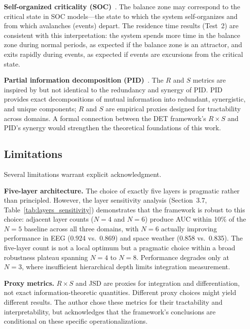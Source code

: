 \documentclass[aip,cha,reprint,amsmath,amssymb]{revtex4-2}
\begin{document}
\textbf{Self-organized criticality (SOC)}~\cite{bak1987,olami1992,strogatz2015}. The balance zone may correspond to the critical state in SOC models---the state to which the system self-organizes and from which avalanches (events) depart. The residence time results (Test~2) are consistent with this interpretation: the system spends more time in the balance zone during normal periods, as expected if the balance zone is an attractor, and exits rapidly during events, as expected if events are excursions from the critical state.

\textbf{Partial information decomposition (PID)}~\cite{williams2010,aguilera2019,popiel2020}. The $R$ and $S$ metrics are inspired by but not identical to the redundancy and synergy of PID. PID provides exact decompositions of mutual information into redundant, synergistic, and unique components; $R$ and $S$ are empirical proxies designed for tractability across domains. A formal connection between the DET framework's $R \times S$ and PID's synergy would strengthen the theoretical foundations of this work.

\subsection{Limitations}

Several limitations warrant explicit acknowledgment.

\textbf{Five-layer architecture.} The choice of exactly five layers is pragmatic rather than principled. However, the layer sensitivity analysis (Section~3.7, Table~\ref{tab:layers_sensitivity}) demonstrates that the framework is robust to this choice: adjacent layer counts ($N = 4$ and $N = 6$) produce AUC within 10\% of the $N = 5$ baseline across all three domains, with $N = 6$ actually improving performance in EEG (0.924 vs.\ 0.869) and space weather (0.858 vs.\ 0.835). The five-layer count is not a local optimum but a pragmatic choice within a broad robustness plateau spanning $N = 4$ to $N = 8$. Performance degrades only at $N = 3$, where insufficient hierarchical depth limits integration measurement.

\textbf{Proxy metrics.} $R \times S$ and JSD are proxies for integration and differentiation, not exact information-theoretic quantities. Different proxy choices might yield different results. The author chose these metrics for their tractability and interpretability, but acknowledges that the framework's conclusions are conditional on these specific operationalizations.
\end{document}
